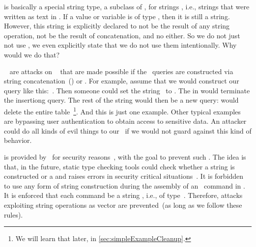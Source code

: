  is basically a special string type, a subclass of , for strings , i.e., strings that were written as text in \python.
If a value or variable is of type , then it is still a string.
However, this string is explicitly declared to not be the result of any string operation, not be the result of concatenation, and no  either.
So we do not just not use , we even explicitly state that we do not use them intentionally.
Why would we do that?%
%
\begin{sloppypar}%
~\cite{ASO2024SIADPP,KDP2024AOSIAITCAIWA,CMCVGHRDCAAFL2023SIADINFD,S2008SI,databases} are attacks on \sql\  that are made possible if the \sql\ queries are constructed via string concatenation~(\pythonil{+}) or .
For example, assume that we would construct our query like this:~.
Then someone could set the string~ to .
The \textil{);} in  would terminate the insertiong query.
The rest of the string would then be a new query:  would delete the entire table~\footnote{We will learn that later, in \cref{sec:simpleExampleCleanup}.}.
And this is just one example.
Other typical examples are bypassing user authentication to obtain access to sensitive data.
An attacker could do all kinds of evil things to our \db\ if we would not guard against this kind of behavior.
\end{sloppypar}%
%
 is provided by \python\ for security reasons~\cite{PEP675}, with the goal to prevent such .
The idea is that, in the future, static type checking tools could check whether a string is constructed or a  and raises errors in security critical situations~\cite{PEP675,VDGE2022PPDAFP:ST}.
It is forbidden to use any form of string construction during the assembly of an \sql\ command in \psycopg.
It is enforced that each command be a string , i.e., of type~.
Therefore, attacks exploiting string operations as vector are prevented~(as long as we follow these rules).

